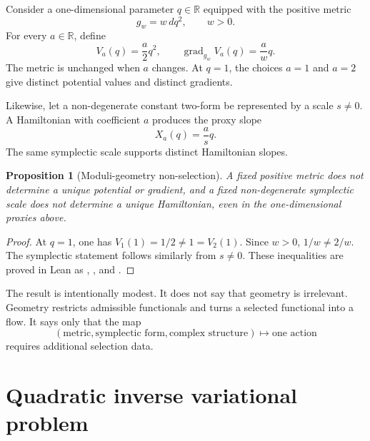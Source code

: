 \documentclass[11pt,a4paper]{article}
\newtheorem{proposition}[theorem]{Proposition}
\theoremstyle{definition}
\theoremstyle{remark}
\newcommand{\R}{\mathbb{R}}
\begin{document}
Consider a one-dimensional parameter $q\in\R$ equipped with the positive
metric
\begin{equation}
  g_w = w\,dq^2, \qquad w>0.
\end{equation}
For every $a\in\R$, define
\begin{equation}
  V_a(q)=\frac{a}{2}q^2,
  \qquad
  \operatorname{grad}_{g_w}V_a(q)=\frac{a}{w}q.
\end{equation}
The metric is unchanged when $a$ changes. At $q=1$, the choices $a=1$ and
$a=2$ give distinct potential values and distinct gradients.

Likewise, let a non-degenerate constant two-form be represented by a scale
$s\ne0$. A Hamiltonian with coefficient $a$ produces the proxy slope
\begin{equation}
  X_a(q)=\frac{a}{s}q.
\end{equation}
The same symplectic scale supports distinct Hamiltonian slopes.

\begin{proposition}[Moduli-geometry non-selection]
A fixed positive metric does not determine a unique potential or gradient, and
a fixed non-degenerate symplectic scale does not determine a unique
Hamiltonian, even in the one-dimensional proxies above.
\end{proposition}

\begin{proof}
At $q=1$, one has $V_1(1)=1/2\ne1=V_2(1)$. Since $w>0$,
$1/w\ne2/w$. The symplectic statement follows similarly from $s\ne0$.
These inequalities are proved in Lean as
,
, and
.
\end{proof}

The result is intentionally modest. It does not say that geometry is
irrelevant. Geometry restricts admissible functionals and turns a selected
functional into a flow. It says only that the map
\begin{equation}
  (\text{metric},\text{symplectic form},\text{complex structure})
  \longmapsto \text{one action}
\end{equation}
requires additional selection data.

\section{Quadratic inverse variational problem}
\label{sec:helmholtz}
\end{document}
